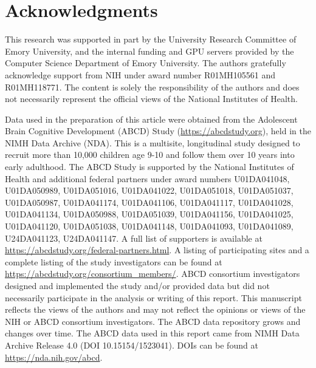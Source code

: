 \section{Acknowledgments}

This research was supported in part by the University Research Committee of Emory University, and the internal funding and GPU servers provided by the Computer Science Department of Emory University. The authors gratefully acknowledge support from NIH under award number R01MH105561 and R01MH118771. The content is solely the responsibility of the authors and does not necessarily represent the official views of the National Institutes of Health. 

Data used in the preparation of this article were obtained from the Adolescent Brain Cognitive Development (ABCD) Study (\url{https://abcdstudy.org}), held in the NIMH Data Archive (NDA). This is a multisite, longitudinal study designed to recruit more than 10,000 children age 9-10 and follow them over 10 years into early adulthood. The ABCD Study\textsuperscript{\textregistered} is supported by the National Institutes of Health and additional federal partners under award numbers U01DA041048, U01DA050989, U01DA051016, U01DA041022, U01DA051018, U01DA051037, U01DA050987, U01DA041174, U01DA041106, U01DA041117, U01DA041028, U01DA041134, U01DA050988, U01DA051039, U01DA041156, U01DA041025, U01DA041120, U01DA051038, U01DA041148, U01DA041093, U01DA041089, U24DA041123, U24DA041147. A full list of supporters is available at  \sloppy\url{https://abcdstudy.org/federal-partners.html}. A listing of participating sites and a complete listing of the study investigators can be found at  \url{https://abcdstudy.org/consortium_members/}. ABCD consortium investigators designed and implemented the study and/or provided data but did not necessarily participate in the analysis or writing of this report. This manuscript reflects the views of the authors and may not reflect the opinions or views of the NIH or ABCD consortium investigators. The ABCD data repository grows and changes over time. The ABCD data used in this report came from NIMH Data Archive Release 4.0 (DOI 10.15154/1523041). DOIs can be found at \url{https://nda.nih.gov/abcd}.
\newpage